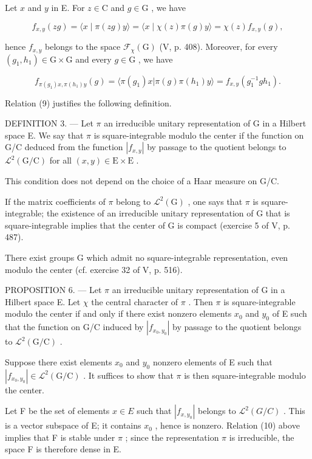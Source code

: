Let \(x\) and \(y\) in E. For \(z \in \mathrm{C}\) and \(g \in \mathrm{G}\) , we have

\[
f _ {x, y} (z g) = \langle x \mid \pi (z g) y \rangle = \langle x \mid \chi (z) \pi (g) y \rangle = \chi (z) f _ {x, y} (g),\tag{9}
\]

hence \(f_{x,y}\) belongs to the space \(\mathcal{F}_{\chi}(\mathrm{G})\) (V, p. 408). Moreover, for every \((g_1, h_1) \in \mathrm{G} \times \mathrm{G}\) and every \(g \in \mathrm{G}\) , we have

\[
f _ {\pi (g _ {1}) x, \pi (h _ {1}) y} (g) = \langle \pi (g _ {1}) x | \pi (g) \pi (h _ {1}) y \rangle = f _ {x, y} (g _ {1} ^ {- 1} g h _ {1}).\tag{10}
\]

Relation (9) justifies the following definition.

DEFINITION 3. --- Let \(\pi\) an irreducible unitary representation of G in a Hilbert space E. We say that \(\pi\) is square-integrable modulo the center if the function on G/C deduced from the function \(|f_{x,y}|\) by passage to the quotient belongs to \(\mathcal{L}^2 (\mathrm{G / C})\) for all \((x,y)\in \mathrm{E}\times \mathrm{E}\) .

This condition does not depend on the choice of a Haar measure on G/C.

If the matrix coefficients of \(\pi\) belong to \(\mathcal{L}^2 (\mathrm{G})\) , one says that \(\pi\) is square-integrable; the existence of an irreducible unitary representation of G that is square-integrable implies that the center of G is compact (exercise 5 of V, p. 487).

There exist groups G which admit no square-integrable representation, even modulo the center (cf. exercise 32 of V, p. 516).

PROPOSITION 6. --- Let \(\pi\) an irreducible unitary representation of G in a Hilbert space E. Let \(\chi\) the central character of \(\pi\) . Then \(\pi\) is square-integrable modulo the center if and only if there exist nonzero elements \(x_0\) and \(y_0\) of E such that the function on G/C induced by \(|f_{x_0,y_0}|\) by passage to the quotient belongs to \(\mathcal{L}^2 (\mathrm{G / C})\) .

Suppose there exist elements \(x_{0}\) and \(y_{0}\) nonzero elements of E such that \(|f_{x_{0},y_{0}}| \in \mathcal{L}^{2}(\mathrm{G/C})\) . It suffices to show that \(\pi\) is then square-integrable modulo the center.

 Let F be the set of elements \(x \in E\) such that \(|f_{x,y_{0}}|\) belongs to \(\mathcal{L}^{2}(G/C)\) . This is a vector subspace of E; it contains \(x_{0}\) , hence is nonzero. Relation (10) above implies that F is stable under \(\pi\) ; since the representation \(\pi\) is irreducible, the space F is therefore dense in E.

